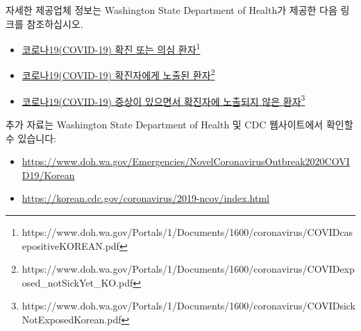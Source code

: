 \documentclass[10pt]{article}
\newcommand{\link}[2]{\href{#1}{#2}\footnote{#1}}
\begin{document}
자세한 제공업체 정보는 Washington State Department of Health가 제공한 다음 링크를
참조하십시오.

\begin{itemize}
\item

  \link{https://www.doh.wa.gov/Portals/1/Documents/1600/coronavirus/COVIDcasepositiveKOREAN.pdf}{코로나19(COVID-19)
  확진 또는 의심 환자}

\item

  \link{https://www.doh.wa.gov/Portals/1/Documents/1600/coronavirus/COVIDexposed\_notSickYet\_KO.pdf}{코로나19(COVID-19)
  확진자에게 노출된 환자}

\item

  \link{https://www.doh.wa.gov/Portals/1/Documents/1600/coronavirus/COVIDsickNotExposedKorean.pdf}{코로나19(COVID-19)
  증상이 있으면서 확진자에 노출되지 않은 환자}

\end{itemize}

추가 자료는 Washington State Department of Health 및 CDC 웹사이트에서 확인할 수 있습니다:

\begin{itemize}
\item

  \url{https://www.doh.wa.gov/Emergencies/NovelCoronavirusOutbreak2020COVID19/Korean}

\item

  \url{https://korean.cdc.gov/coronavirus/2019-ncov/index.html}

\end{itemize}
\end{document}
